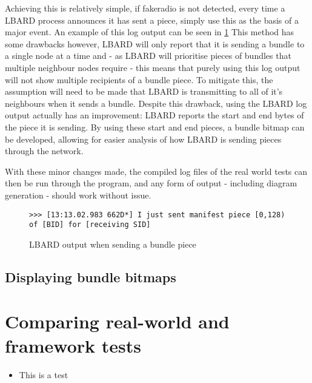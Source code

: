 Achieving this is relatively simple, if fakeradio is not detected, every time a LBARD process announces it has sent a piece, simply use this as the basis of a major event.
An example of this log output can be seen in \figurename{ \ref{fig:chapter6RLBARDSent}}
This method has some drawbacks however, LBARD will only report that it is sending a bundle to a single node at a time and - as LBARD will prioritise pieces of bundles that multiple neighbour nodes require - this means that purely using this log output will not show multiple recipients of a bundle piece.
To mitigate this, the assumption will need to be made that LBARD is transmitting to all of it's neighbours when it sends a bundle.
Despite this drawback, using the LBARD log output actually has an improvement: LBARD reports the start and end bytes of the piece it is sending.
By using these start and end pieces, a bundle bitmap can be developed, allowing for easier analysis of how LBARD is sending pieces through the network.

With these minor changes made, the compiled log files of the real world tests can then be run through the program, and any form of output - including diagram generation - should work without issue.


\begin{figure}
    \begin{centering}
\begin{lstlisting}[basicstyle=\small, breaklines]
    >>> [13:13.02.983 662D*] I just sent manifest piece [0,128) of [BID] for [receiving SID]
\end{lstlisting}
        \caption{LBARD output when sending a bundle piece}
        \label{fig:chapter6RLBARDSent}
    \end{centering}
\end{figure}


\subsection{Displaying bundle bitmaps}



\section{Comparing real-world and framework tests}
\begin{itemize}
    \item This is a test
\end{itemize}
